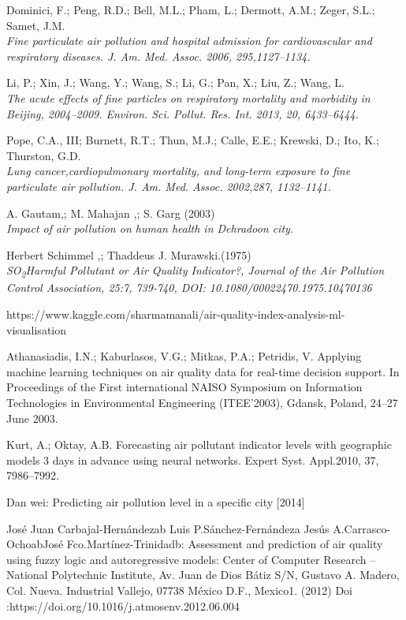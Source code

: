 \documentclass{article}
\begin{document}
\begin{thebibliography}{9}
 Dominici, F.; Peng, R.D.; Bell, M.L.; Pham, L.; Dermott, A.M.; Zeger, S.L.; Samet, J.M.\\ \textit{Fine particulate air
pollution and hospital admission for cardiovascular and respiratory diseases. J. Am. Med. Assoc. 2006, 295,1127–1134.}

 Li, P.; Xin, J.; Wang, Y.; Wang, S.; Li, G.; Pan, X.; Liu, Z.; Wang, L.\\
\textit{The acute effects of fine particles on
respiratory mortality and morbidity in Beijing, 2004–2009. Environ. Sci. Pollut. Res. Int. 2013, 20, 6433–6444.}

Pope, C.A., III; Burnett, R.T.; Thun, M.J.; Calle, E.E.; Krewski, D.; Ito, K.; Thurston, G.D.\\
\textit{Lung cancer,cardiopulmonary mortality, and long-term exposure to fine particulate air pollution. J. Am. Med. Assoc. 2002,287, 1132–1141.}

A. Gautam,; M. Mahajan ,; S. Garg (2003)\\
\textit {Impact of air pollution on human health in Dehradoon city.}

Herbert Schimmel ,; Thaddeus J. Murawski.(1975)\\
 \textit{SO\textsubscript{2}\textendash Harmful Pollutant or Air Quality Indicator?, Journal of the Air Pollution Control Association, 25:7, 739-740, DOI:
10.1080/00022470.1975.10470136}

https://www.kaggle.com/sharmamanali/air-quality-index-analysis-ml-visualisation

Athanasiadis, I.N.; Kaburlasos, V.G.; Mitkas, P.A.; Petridis, V. Applying machine learning techniques on air
quality data for real-time decision support. In Proceedings of the First international NAISO Symposium on
Information Technologies in Environmental Engineering (ITEE’2003), Gdansk, Poland, 24–27 June 2003.

Kurt, A.; Oktay, A.B. Forecasting air pollutant indicator levels with geographic models 3 days in advance
using neural networks. Expert Syst. Appl.2010, 37, 7986–7992.

Dan wei: Predicting air pollution level in a specific city 
[2014]

José Juan Carbajal-Hernándezab Luis P.Sánchez-Fernándeza 
Jesús A.Carrasco-OchoabJosé Fco.Martínez-Trinidadb: 
Assessment and prediction of air quality using fuzzy logic 
and autoregressive models: Center of Computer Research –
National Polytechnic Institute, Av. Juan de Dios Bátiz S/N, 
Gustavo A. Madero, Col. Nueva. Industrial Vallejo, 07738 
México D.F., Mexico1. (2012) Doi 
:https://doi.org/10.1016/j.atmosenv.2012.06.004


\end{thebibliography}
\end{document}
